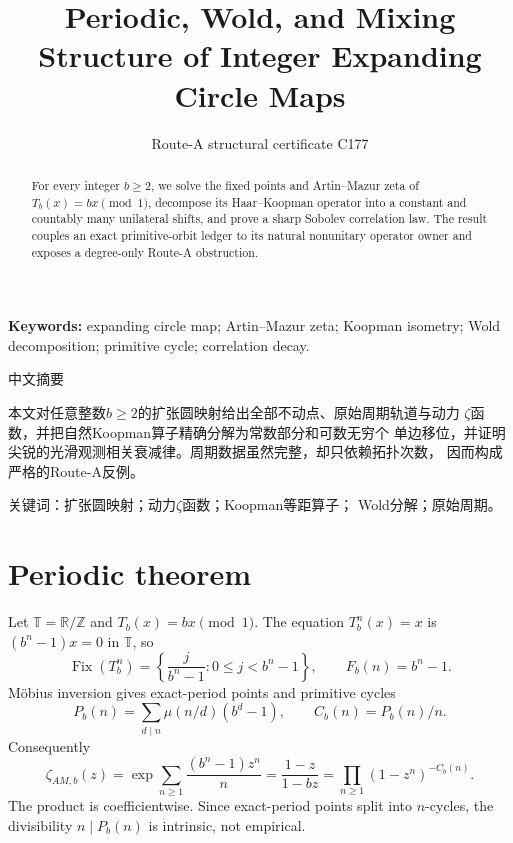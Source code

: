 \documentclass[10pt]{article}
\title{Periodic, Wold, and Mixing Structure of Integer Expanding Circle Maps}
\author{Route-A structural certificate C177}
\date{}
\begin{document}
\maketitle
\begin{abstract}
For every integer $b\ge2$, we solve the fixed points and Artin--Mazur zeta of
$T_b(x)=bx\pmod1$, decompose its Haar--Koopman operator into a constant and
countably many unilateral shifts, and prove a sharp Sobolev correlation law.
The result couples an exact primitive-orbit ledger to its natural nonunitary
operator owner and exposes a degree-only Route-A obstruction.
\end{abstract}
\noindent\textbf{Keywords:} expanding circle map; Artin--Mazur zeta;
Koopman isometry; Wold decomposition; primitive cycle; correlation decay.

\begin{otherlanguage}{chinese-simplified}
\begin{center}{\large 中文摘要}\end{center}
本文对任意整数$b\ge2$的扩张圆映射给出全部不动点、原始周期轨道与动力
$\zeta$函数，并把自然\foreignlanguage{english}{Koopman}算子精确分解为常数部分和可数无穷个
单边移位，并证明尖锐的光滑观测相关衰减律。周期数据虽然完整，却只依赖拓扑次数，
因而构成严格的\foreignlanguage{english}{Route-A}反例。

\noindent 关键词：扩张圆映射；动力$\zeta$函数；\foreignlanguage{english}{Koopman}等距算子；
\foreignlanguage{english}{Wold}分解；原始周期。
\end{otherlanguage}

\section{Periodic theorem}
Let $\mathbb T=\mathbb R/\mathbb Z$ and $T_b(x)=bx\pmod1$.  The equation
$T_b^n(x)=x$ is $(b^n-1)x=0$ in $\mathbb T$, so
\[
 \operatorname{Fix}(T_b^n)=\left\{\frac{j}{b^n-1}:0\le j<b^n-1\right\},
 \qquad F_b(n)=b^n-1.
\]
Möbius inversion gives exact-period points and primitive cycles
\[
 P_b(n)=\sum_{d\mid n}\mu(n/d)(b^d-1),\qquad C_b(n)=P_b(n)/n.
\]
Consequently
\[
 \zeta_{AM,b}(z)=\exp\!\sum_{n\ge1}\frac{(b^n-1)z^n}{n}
 =\frac{1-z}{1-bz}
 =\prod_{n\ge1}(1-z^n)^{-C_b(n)}.
\]
The product is coefficientwise.  Since exact-period points split into
$n$-cycles, the divisibility $n\mid P_b(n)$ is intrinsic, not empirical.
\end{document}

